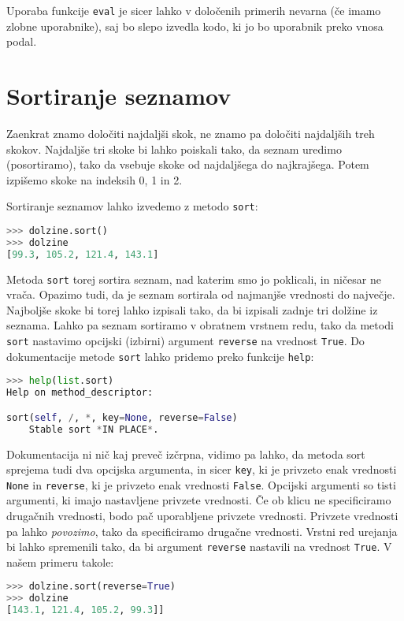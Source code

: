 Uporaba funkcije \texttt{eval} je sicer lahko v določenih primerih nevarna (če imamo zlobne uporabnike), saj bo slepo izvedla kodo, ki jo bo uporabnik preko vnosa podal.

\section{Sortiranje seznamov}

Zaenkrat znamo določiti najdaljši skok, ne znamo pa določiti najdaljših treh skokov. Najdaljše tri skoke bi lahko poiskali tako, da seznam uredimo (posortiramo), tako da vsebuje skoke od najdaljšega do najkrajšega. Potem izpišemo skoke na indeksih 0, 1 in 2. 

Sortiranje seznamov lahko izvedemo z metodo \texttt{sort}:
\begin{lstlisting}[language=Python]
>>> dolzine.sort()
>>> dolzine
[99.3, 105.2, 121.4, 143.1]
\end{lstlisting}
Metoda \texttt{sort} torej sortira seznam, nad katerim smo jo poklicali, in ničesar ne vrača. Opazimo tudi, da je seznam sortirala od najmanjše vrednosti do največje. Najboljše skoke bi torej lahko izpisali tako, da bi izpisali zadnje tri dolžine iz seznama. Lahko pa seznam sortiramo v obratnem vrstnem redu, tako da metodi \texttt{sort} nastavimo opcijski (izbirni) argument \texttt{reverse} na vrednost \texttt{True}. Do dokumentacije metode \texttt{sort} lahko pridemo preko funkcije \texttt{help}:
\begin{lstlisting}[language=Python]
>>> help(list.sort)
Help on method_descriptor:

sort(self, /, *, key=None, reverse=False)
    Stable sort *IN PLACE*.
\end{lstlisting}
Dokumentacija ni nič kaj preveč izčrpna, vidimo pa lahko, da metoda sort sprejema tudi dva opcijska argumenta, in sicer \texttt{key}, ki je privzeto enak vrednosti \texttt{None} in \texttt{reverse}, ki je privzeto enak vrednosti \texttt{False}. Opcijski argumenti so tisti argumenti, ki imajo nastavljene privzete vrednosti. Če ob klicu ne specificiramo drugačnih vrednosti, bodo pač uporabljene privzete vrednosti. Privzete vrednosti pa lahko \emph{povozimo}, tako da specificiramo drugačne vrednosti. Vrstni red urejanja bi lahko spremenili tako, da bi argument \texttt{reverse} nastavili na vrednost \texttt{True}. V našem primeru takole:
\begin{lstlisting}[language=Python]
>>> dolzine.sort(reverse=True)
>>> dolzine
[143.1, 121.4, 105.2, 99.3]]
\end{lstlisting}

